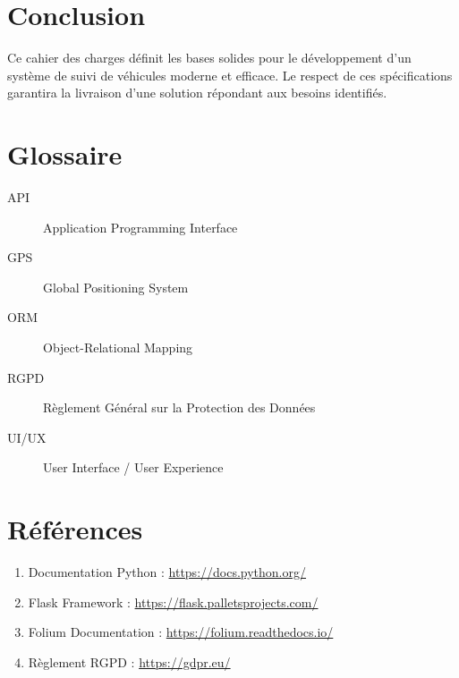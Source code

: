 \documentclass[12pt,a4paper]{article}
\begin{document}
\section{Conclusion}

\lipsum[21-22]

Ce cahier des charges définit les bases solides pour le développement d'un système de suivi de véhicules moderne et efficace. Le respect de ces spécifications garantira la livraison d'une solution répondant aux besoins identifiés.

\newpage
\appendix

\section{Glossaire}

\begin{description}
    \item[API] Application Programming Interface
    \item[GPS] Global Positioning System
    \item[ORM] Object-Relational Mapping
    \item[RGPD] Règlement Général sur la Protection des Données
    \item[UI/UX] User Interface / User Experience
\end{description}

\section{Références}

\begin{enumerate}
    \item Documentation Python : \url{https://docs.python.org/}
    \item Flask Framework : \url{https://flask.palletsprojects.com/}
    \item Folium Documentation : \url{https://folium.readthedocs.io/}
    \item Règlement RGPD : \url{https://gdpr.eu/}
\end{enumerate}
\end{document}
